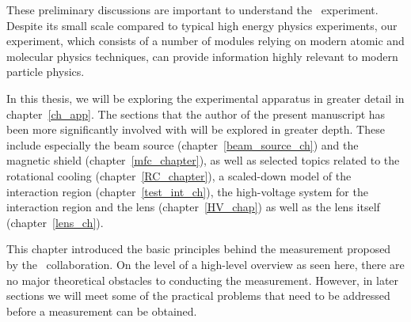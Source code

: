 
These preliminary discussions are important to understand the \CENTREX\
experiment. Despite its small scale compared to typical high energy physics
experiments, our experiment, which consists of a number of modules relying on
modern atomic and molecular physics techniques, can provide information highly
relevant to modern particle physics.


In this thesis, we will be exploring the experimental apparatus in greater
detail in chapter~\ref{ch_app}. The sections that the author of the present
manuscript has been more significantly involved with will be explored in greater
depth. These include especially the beam source (chapter~\ref{beam_source_ch})
and the magnetic shield (chapter~\ref{mfc_chapter}), as well as selected topics
related to the rotational cooling (chapter~\ref{RC_chapter}), a scaled-down
model of the interaction region (chapter~\ref{test_int_ch}), the high-voltage
system for the interaction region and the lens (chapter~\ref{HV_chap}) as well
as the lens itself (chapter~\ref{lens_ch}).


This chapter introduced the basic principles behind the measurement proposed by
the \CENTREX\ collaboration. On the level of a high-level overview as seen here,
there are no major theoretical obstacles to conducting the measurement. However,
in later sections we will meet some of the practical problems that need to be
addressed before a measurement can be obtained.
